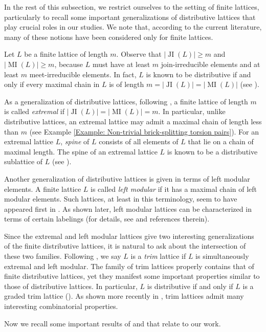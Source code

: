 \documentclass{amsart}
\theoremstyle{thmstyle}
\theoremstyle{exstyle}
\theoremstyle{defstyle}
\theoremstyle{remstyle}
\theoremstyle{remstyle}
\DeclareMathOperator*{\JI}{JI}
\DeclareMathOperator*{\MI}{MI}
\begin{document}
In the rest of this subsection, we restrict ourselves to the setting of finite lattices, particularly to recall some important generalizations of distributive lattices that play crucial roles in our studies. We note that, according to the current literature, many of these notions have been considered only for finite lattices. 

Let $L$ be a finite lattice of length $m$. Observe that $|{\JI(L)}|\geq m$ and $|{\MI(L)}|\geq m$, because $L$ must have at least $m$ join-irreducible elements and at least $m$ meet-irreducible elements. In fact, $L$ is known to be distributive if and only if every maximal chain in $L$ is of length $m=|{\JI(L)}|=|{\MI(L)}|$ (see \cite[Theorem 17]{Ma}). 

As a generalization of distributive lattices, following \cite{Ma}, a finite lattice of length $m$ is called \emph{extremal} if $|{\JI(L)}|=|{\MI(L)}|=m$. In particular, unlike distributive lattices, an extremal lattice may admit a maximal chain of length less than $m$ (see Example \ref{Example: Non-trivial brick-splitting torsion pairs}). For an extremal lattice $L$, \emph{spine} of $L$ consists of all elements of $L$ that lie on a chain of maximal length. The spine of an extremal lattice $L$ is known to be a distributive sublattice of $L$ (see \cite[Prop. 2.6]{TW}). 

Another generalization of distributive lattices is given in terms of left modular elements. A finite lattice $L$ is called \emph{left modular} if it has a maximal chain of left modular elements. Such lattices, at least in this terminology, seem to have appeared first in \cite{BS}. As shown later, left modular lattices can be characterized in terms of certain labelings (for details, see \cite[Section 2.5]{TW} and references therein).

Since the extremal and left modular lattices give two interesting generalizations of the finite distributive lattices, it is natural to ask about the intersection of these two families. Following \cite{Th}, we say $L$ is a \emph{trim} lattice if $L$ is simultaneously extremal and left modular. The family of trim lattices properly contains that of finite distributive lattices, yet they manifest some important properties similar to those of distributive lattices. In particular, $L$ is distributive if and only if $L$ is a graded trim lattice (\cite[Theorem 2]{Th}). 
As shown more recently in \cite{TW}, trim lattices admit many interesting combinatorial properties. 

Now we recall some important results of \cite{TW} and \cite{Mu} that relate to our work.
\end{document}
